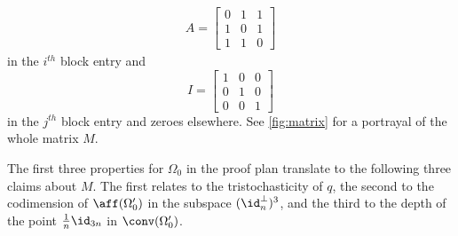 \begin{gather}A = \begin{bmatrix} 0 & 1 & 1 \\ 1 & 0 & 1 \\ 1 & 1 & 0 \end{bmatrix} \label{eq:a-matrix}\end{gather}
 in the $i^{th}$ block entry and 
 $$ I = \begin{bmatrix} 1 & 0 & 0 \\ 0 & 1 & 0 \\ 0 & 0 & 1 \end{bmatrix} $$ in the $j^{th}$ block entry and zeroes elsewhere. See \cref{fig:matrix} for a portrayal of the whole matrix $M$.
 
 
The first three properties for $\Omega_0$ in the proof plan translate to the following three claims about $M$. The first relates to the tristochasticity of $q$, the second to the codimension of $\aff(\Omega_0')$ in the subspace $(\id_n^\perp)^3$, and the third to the depth of the point $\frac{1}{n}\id_{3n}$ in $\conv(\Omega_0')$. 
 
